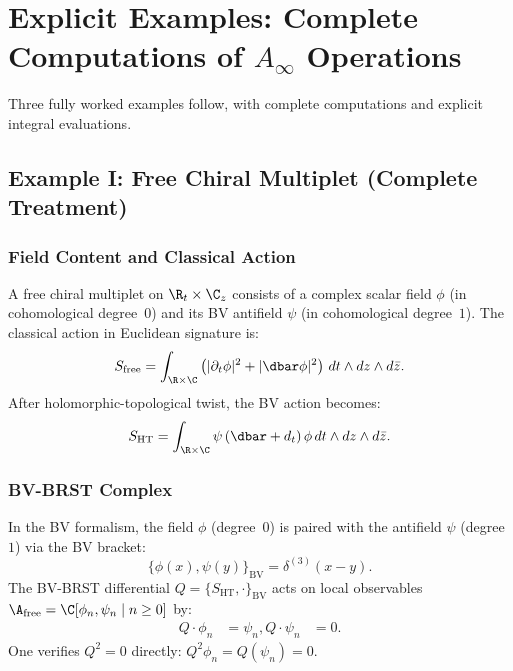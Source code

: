 \section{Explicit Examples: Complete Computations of $A_\infty$ Operations}

Three fully worked examples follow, with complete computations and explicit integral evaluations.
\subsection{Example I: Free Chiral Multiplet (Complete Treatment)}

\subsubsection{Field Content and Classical Action}
A free chiral multiplet on $\R_t \times \C_z$ consists of a complex scalar field $\phi$ (in cohomological degree~$0$) and its BV antifield $\psi$ (in cohomological degree~$1$). The classical action in Euclidean signature is:
\begin{equation}
S_{\text{free}} = \int_{\R \times \C} \left( |\partial_t \phi|^2 + |\dbar \phi|^2 \right) \, dt \wedge dz \wedge d\bar{z}.
\end{equation}
After holomorphic-topological twist, the BV action becomes:
\begin{equation}
S_{\text{HT}} = \int_{\R \times \C} \psi \,(\dbar + d_t)\, \phi \, dt \wedge dz \wedge d\bar{z}.
\end{equation}
\subsubsection{BV-BRST Complex}

In the BV formalism, the field $\phi$ (degree~$0$) is paired with the antifield $\psi$ (degree~$1$) via the BV bracket:
\begin{equation}
\{\phi(x), \psi(y)\}_{\mathrm{BV}} = \delta^{(3)}(x-y).
\end{equation}
The BV-BRST differential $Q = \{S_{\text{HT}}, \cdot\}_{\mathrm{BV}}$ acts on local observables $\A_{\text{free}} = \C[\phi_n, \psi_n \mid n \geq 0]$ by:
\begin{align}
Q \cdot \phi_n &= \psi_n, %
Q \cdot \psi_n &= 0. %
\end{align}
One verifies $Q^2 = 0$ directly: $Q^2\phi_n = Q(\psi_n) = 0$.

